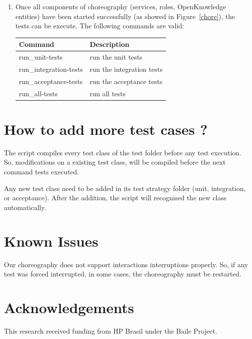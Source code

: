 \documentclass{article}	%
\begin{document}
\begin{enumerate}
  \item Once all components of choreography (services, roles, OpenKnowledge entities) have been started successfully (as showed in Figure~\ref{chore}), the tests can be execute. The following commands are valid:

  \begin{table}[htb]
  \centering
  \begin{tabular}{|l|l|}
  \hline
  Command & Description \\
  \hline
  \hline
  run\_unit-tests & run the unit tests\\
  run\_integration-tests & run the integration tests \\
  run\_acceptance-tests & run the acceptance tests \\
  run\_all-tests & run all tests \\
  \hline
  \end{tabular}
  \end{table}

\end{enumerate}


\section{ How to add more test cases ? }
The script compiles every test class of the test folder before any test execution. So, modifications on a existing test class, will be compiled before the next command tests executed.

Any new test class need to be added in its test strategy folder (unit, integration, or acceptance). After the addition, the script will recognised the new class automatically. 

\section{ Known Issues }
Our choreography does not support interactions interruptions properly. So, if any test was forced interrupted, in some cases, the choreography must be restarted.

\section{Acknowledgements}
This research received funding from HP Brasil under the Baile Project.


\newpage

\end{document}
